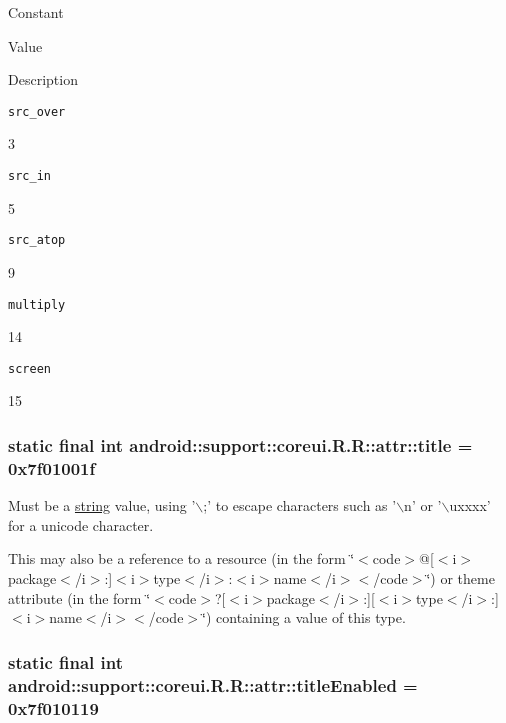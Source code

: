 Constant

Value

Description 

{\tt src\_\-over}

3

{\tt src\_\-in}

5

{\tt src\_\-atop}

9

{\tt multiply}

14

{\tt screen}

15\hypertarget{classandroid_1_1support_1_1coreui_1_1_r_1_1attr_3612e087135c86edb391ca41fb78b24b}{
\subsubsection[{title}]{\setlength{\rightskip}{0pt plus 5cm}static final int android::support::coreui.R.R::attr::title = 0x7f01001f}}
\label{classandroid_1_1support_1_1coreui_1_1_r_1_1attr_3612e087135c86edb391ca41fb78b24b}


Must be a \hyperlink{classandroid_1_1support_1_1coreui_1_1_r_1_1string}{string} value, using '$\backslash$;' to escape characters such as '$\backslash$n' or '$\backslash$uxxxx' for a unicode character. 

This may also be a reference to a resource (in the form \char`\"{}$<$code$>$@\mbox{[}$<$i$>$package$<$/i$>$:\mbox{]}$<$i$>$type$<$/i$>$:$<$i$>$name$<$/i$>$$<$/code$>$\char`\"{}) or theme attribute (in the form \char`\"{}$<$code$>$?\mbox{[}$<$i$>$package$<$/i$>$:\mbox{]}\mbox{[}$<$i$>$type$<$/i$>$:\mbox{]}$<$i$>$name$<$/i$>$$<$/code$>$\char`\"{}) containing a value of this type. \hypertarget{classandroid_1_1support_1_1coreui_1_1_r_1_1attr_c26adaffde765ec3e94d40fe60d230f4}{
\subsubsection[{titleEnabled}]{\setlength{\rightskip}{0pt plus 5cm}static final int android::support::coreui.R.R::attr::titleEnabled = 0x7f010119}}
\label{classandroid_1_1support_1_1coreui_1_1_r_1_1attr_c26adaffde765ec3e94d40fe60d230f4}


